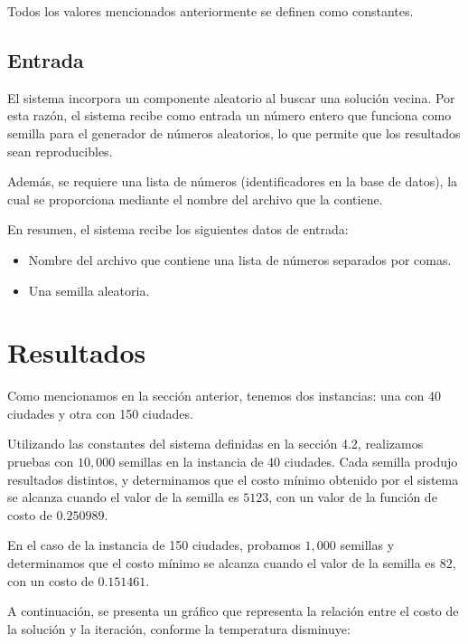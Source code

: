 \documentclass[spanish,12pt,letterpaper]{article}
\begin{document}
	Todos los valores mencionados anteriormente se definen como constantes.
	\subsection{Entrada}
	El sistema incorpora un componente aleatorio al buscar una solución vecina. Por esta razón, el sistema recibe como entrada un número entero que funciona como semilla para el generador de números aleatorios, lo que permite que los resultados sean reproducibles.
	
	Además, se requiere una lista de números (identificadores en la base de datos), la cual se proporciona mediante el nombre del archivo que la contiene.
	
	En resumen, el sistema recibe los siguientes datos de entrada:
	\begin{itemize}
		\item Nombre del archivo que contiene una lista de números separados por comas.
		\item Una semilla aleatoria.
	\end{itemize}
	
	
	\section{Resultados}
	Como mencionamos en la sección anterior, tenemos dos instancias: una con 40 ciudades y otra con 150 ciudades.
	
	Utilizando las constantes del sistema definidas en la sección 4.2, realizamos pruebas con $10,000$ semillas en la instancia de 40 ciudades. Cada semilla produjo resultados distintos, y determinamos que el costo mínimo obtenido por el sistema se alcanza cuando el valor de la semilla es $5123$, con un valor de la función de costo de $0.250989$.
	
	En el caso de la instancia de 150 ciudades, probamos $1,000$ semillas y determinamos que el costo mínimo se alcanza cuando el valor de la semilla es $82$, con un costo de $0.151461$.
	
	A continuación, se presenta un gráfico que representa la relación entre el costo de la solución y la iteración, conforme la temperatura disminuye:
	
\end{document}
